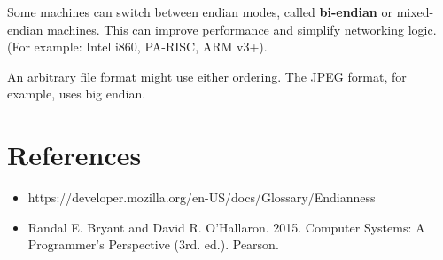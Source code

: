 Some machines can switch between endian modes, called \textbf{bi-endian} or {mixed-endian} machines. This can improve performance and simplify networking logic. (For example: Intel i860, PA-RISC, ARM v3+).

An arbitrary file format might use either ordering. The JPEG format, for example, uses big endian.

\section{References}

\begin{itemize}
	\item https://developer.mozilla.org/en-US/docs/Glossary/Endianness
	\item Randal E. Bryant and David R. O'Hallaron. 2015. Computer Systems: A Programmer's Perspective (3rd. ed.). Pearson.
\end{itemize}